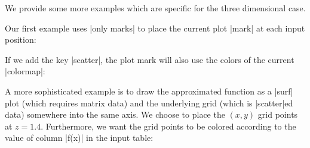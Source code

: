{We provide some more examples which are specific for the three dimensional case.

Our first example uses |only marks| to place the current plot |mark| at each
input position:
%
\pgfplotsexpensiveexample
\begin{codeexample}[]
\end{codeexample}

If we add the key |scatter|, the plot mark will also use the colors of the
current |colormap|:
%
\pgfplotsexpensiveexample
\begin{codeexample}[]
\end{codeexample}

A more sophisticated example is to draw the approximated function as a |surf|
plot (which requires matrix data) and the underlying grid (which is |scatter|ed
data) somewhere into the same axis. We choose to place the $(x,y)$ grid points
at $z=1.4$. Furthermore, we want the grid points to be colored according to the
value of column |f(x)| in the input table:

}
